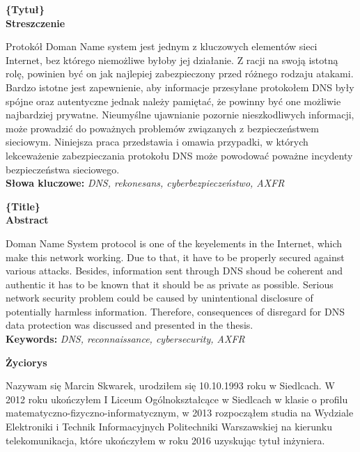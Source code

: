 \newpage

\clearpage
{}
\newpage
\clearpage
{}
\begin{center}
	\fontsize{18pt}{12pt}\selectfont\textbf{\{Tytuł\}}\\
	\vspace{1cm}
	\fontsize{14pt}{12pt}\selectfont
	\textbf{Streszczenie}
\end{center}
Protokół Doman Name system jest jednym z kluczowych elementów sieci Internet, bez którego niemożliwe byłoby jej działanie.
Z racji na swoją istotną rolę, powinien być on jak najlepiej zabezpieczony przed różnego rodzaju atakami. Bardzo istotne jest zapewnienie,
aby informacje przesyłane protokołem DNS były spójne oraz autentyczne jednak należy pamiętać, że powinny być one możliwie najbardziej
prywatne. Nieumyślne ujawnianie pozornie nieszkodliwych informacji, może prowadzić do poważnych problemów związanych z bezpieczeństwem
sieciowym. Niniejsza praca przedstawia i omawia przypadki, w których lekceważenie zabezpieczania protokołu DNS może powodować poważne
incydenty bezpieczeństwa sieciowego.\\
\noindent\textbf{Słowa kluczowe:} \textit{DNS, rekonesans, cyberbezpieczeństwo, AXFR}\\
\vspace{1.5cm}

\begin{center}
	\fontsize{18pt}{12pt}\selectfont\textbf{\{Title\}}\\
	\vspace{1cm}
	\fontsize{14pt}{12pt}\selectfont
	\textbf{Abstract}
\end{center}
Doman Name System protocol is one of the keyelements in the Internet, which make this network working. Due to that, it have to be
properly secured against various attacks. Besides, information sent through DNS shoud be coherent and authentic it has to be
known that it should be as private as possible. Serious network security problem could be caused by unintentional disclosure of
potentially harmless information. Therefore, consequences of disregard for DNS data protection was discussed and presented in the thesis.
\\
\noindent\textbf{Keywords:} \textit{DNS, reconnaissance, cybersecurity, AXFR}\\
\vspace{1.5cm}

\newpage
\begin{center}
	\textbf{Życiorys}
\end{center}
\vspace{1cm}
Nazywam się Marcin Skwarek, urodziłem się 10.10.1993 roku w Siedlcach. W 2012 roku ukończyłem I Liceum Ogólnokształcące w Siedlcach
w klasie o profilu matematyczno-fizyczno-informatycznym, w 2013 rozpocząłem studia na Wydziale Elektroniki i Technik Informacyjnych
Politechniki Warszawskiej na kierunku telekomunikacja, które ukończyłem w roku 2016 uzyskując tytuł inżyniera.
